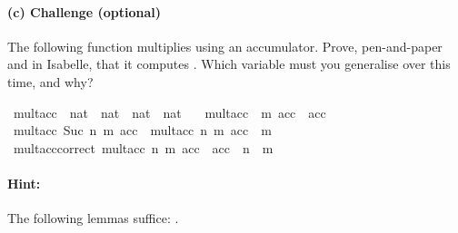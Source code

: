 \begin{isabellebody}
\begin{isamarkuptext}
\paragraph{(c) Challenge (optional)} The following function multiplies using an accumulator.
  Prove, pen-and-paper and in Isabelle, that it computes . Which variable must you
  generalise over this time, and why?%
\end{isamarkuptext}\isamarkuptrue%
\isamarkupfalse%
\ mult{\isacharunderscore}{\kern0pt}acc\ {\isacharcolon}{\kern0pt}{\isacharcolon}{\kern0pt}\ {\isachardoublequoteopen}nat\ {\isasymRightarrow}\ nat\ {\isasymRightarrow}\ nat\ {\isasymRightarrow}\ nat{\isachardoublequoteclose}\ \isanewline
\ \ {\isachardoublequoteopen}mult{\isacharunderscore}{\kern0pt}acc\ {}\ m\ acc\ {\isacharequal}{\kern0pt}\ acc{\isachardoublequoteclose}\isanewline
{\isacharbar}{\kern0pt}\ {\isachardoublequoteopen}mult{\isacharunderscore}{\kern0pt}acc\ {\isacharparenleft}{\kern0pt}Suc\ n{\isacharparenright}{\kern0pt}\ m\ acc\ {\isacharequal}{\kern0pt}\ mult{\isacharunderscore}{\kern0pt}acc\ n\ m\ {\isacharparenleft}{\kern0pt}acc\ {\isacharplus}{\kern0pt}\ m{\isacharparenright}{\kern0pt}{\isachardoublequoteclose}\isanewline
\isanewline
{}\isamarkupfalse%
\ mult{\isacharunderscore}{\kern0pt}acc{\isacharunderscore}{\kern0pt}correct{\isacharcolon}{\kern0pt}\ {\isachardoublequoteopen}mult{\isacharunderscore}{\kern0pt}acc\ n\ m\ acc\ {\isacharequal}{\kern0pt}\ acc\ {\isacharplus}{\kern0pt}\ n\ {\isacharasterisk}{\kern0pt}\ m{\isachardoublequoteclose}%
\begin{isamarkuptext}%
\paragraph{Hint:} The following lemmas suffice:
      .%
\end{isamarkuptext}\isamarkuptrue%
%
\isadelimproof
%
\endisadelimproof
%
\isatagproof
\isanewline
%
\endisatagproof
{\isafoldproof}%
%
\isadelimproof
%
\endisadelimproof
%
\isadelimtheory
%
\endisadelimtheory
%
\isatagtheory
%
\endisatagtheory
{\isafoldtheory}%
%
\isadelimtheory
%
\endisadelimtheory
%
\end{isabellebody}%
